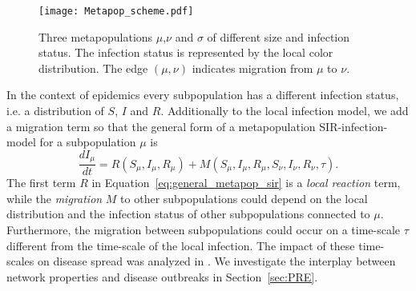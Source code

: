 \begin{SCfigure}
\texttt{[image: Metapop\_scheme.pdf]}
\caption{Three metapopulations $\mu $,$\nu $ and $\sigma $ of different size and infection status.
The infection status is represented by the local color distribution.
The edge $(\mu, \nu )$ indicates migration from $\mu $ to $\nu $.}
\label{fig:metapop_scheme}
\end{SCfigure}

In the context of epidemics every subpopulation has a different infection status, i.e. a distribution of $S$, $I$ and $R$.
Additionally to the local infection model, we add a migration term so that the general form of a metapopulation SIR-infection-model for a subpopulation $\mu $ is
\begin{equation}\label{eq:general_metapop_sir}
\frac{dI_\mu }{dt} = R(S_\mu, I_\mu , R_\mu) + M (S_\mu, I_\mu , R_\mu, S_\nu ,I_\nu ,R_\nu, \tau ).
\end{equation}
The first term $R$ in Equation~\eqref{eq:general_metapop_sir} is a \emph{local reaction} term, while the \emph{migration} $M$ to other subpopulations could depend on the local distribution and the infection status of other subpopulations connected to $\mu $.
Furthermore, the migration between subpopulations could occur on a time-scale $\tau $ different from the time-scale of the local infection.
The impact of these time-scales on disease spread was analyzed in  \citep{cross2005,Balcan:2011gv,Lentz:2012pre}.
We investigate the interplay between network properties and disease outbreaks in Section~\ref{sec:PRE}. 
%


%
%
%
